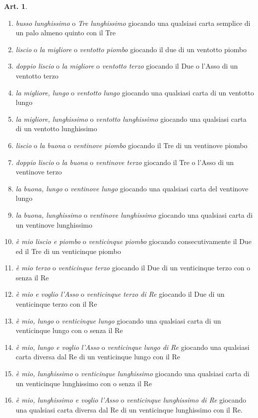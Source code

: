\documentclass[italian,a4paper]{article}
\theoremstyle{definition}
\newtheorem{art}{Art.}
\begin{document}
\begin{art}
\begin{enumerate}
\item      \emph{busso lunghissimo} o \emph{Tre lunghissimo} giocando una qualsiasi carta
semplice di un palo almeno quinto con il Tre
\item      \emph{liscio} o \emph{la migliore} o \emph{ventotto piombo} giocando il due di un
ventotto piombo
\item      \emph{doppio liscio} o \emph{la migliore} o \emph{ventotto terzo} giocando il Due o
l’Asso di un ventotto terzo
\item      \emph{la migliore, lungo} o \emph{ventotto lungo} giocando una qualsiasi carta
di un ventotto lungo
\item      \emph{la migliore, lunghissimo} o \emph{ventotto lunghissimo} giocando una
qualsiasi carta di un ventotto lunghissimo
\item      \emph{liscio} o \emph{la buona} o \emph{ventinove piombo} giocando il Tre di un
ventinove piombo
\item      \emph{doppio liscio} o \emph{la buona} o \emph{ventinove terzo} giocando il Tre o
l’Asso di un ventinove terzo
\item      \emph{la buona, lungo} o \emph{ventinove lungo} giocando una qualsiasi carta
del ventinove lungo
\item      \emph{la buona, lunghissimo} o \emph{ventinove lunghissimo} giocando una
qualsiasi carta di un ventinove lunghissimo
\item      \emph{è mio liscio e piombo} o \emph{venticinque piombo} giocando
consecutivamente il Due ed il Tre di un venticinque piombo
\item      \emph{è mio terzo} o \emph{venticinque terzo} giocando il Due di un venticinque
terzo con o senza il Re
\item      \emph{è mio e voglio l’Asso} o \emph{venticinque terzo di Re} giocando il Due
di un venticinque terzo con il Re
\item      \emph{è mio, lungo} o \emph{venticinque lungo} giocando una qualsiasi carta di
un venticinque lungo con o senza il Re
\item      \emph{è mio, lungo e voglio l’Asso} o \emph{venticinque lungo di Re} giocando
una qualsiasi carta diversa dal Re di un venticinque lungo con il Re
\item      \emph{è mio, lunghissimo} o \emph{venticinque lunghissimo} giocando una
qualsiasi carta di un venticinque lunghissimo con o senza il Re
\item      \emph{è mio, lunghissimo e voglio l’Asso} o \emph{venticinque
    lunghissimo di Re} giocando una qualsiasi carta diversa dal Re di un venticinque lunghissimo
con il Re.
\end{enumerate}
\end{art}
\end{document}
